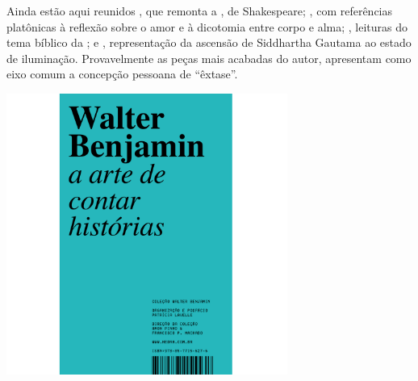 Ainda estão aqui reunidos {}, que remonta a {}, de Shakespeare; {}, com referências platônicas à reflexão sobre o amor e à dicotomia entre corpo e alma; {}, leituras do
tema bíblico da {}; e {}, representação da ascensão de Siddhartha Gautama ao estado de iluminação. Provavelmente as peças mais acabadas do autor, apresentam como eixo comum a concepção pessoana de ``êxtase''. 
%

\vfill

\hspace*{-.4cm}\begin{minipage}[c]{.5\linewidth}
\small{
{}}
\end{minipage}

\pagebreak


\begin{center}
\hspace*{-2.5cm}
\hspace*{2.5cm}\includegraphics[width=92mm]{./grid/benjamin.jpg}
\end{center}

